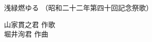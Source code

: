 \documentclass[10pt,b5j]{tarticle} %
\begin{document}
\begin{minipage}[c]{0.7\hsize} %
    \begin{center}
        {\LARGE
            浅緑燃ゆる %
        }
        {\small 
            （昭和二十二年第四十回記念祭歌） %
        }
    \end{center}
\end{minipage}
\begin{minipage}[c]{0.3\hsize} %
    \begin{flushright} %
        山家貫之君 作歌\\堀井洵君 作曲 %
    \end{flushright}
\end{minipage}
\end{document}
